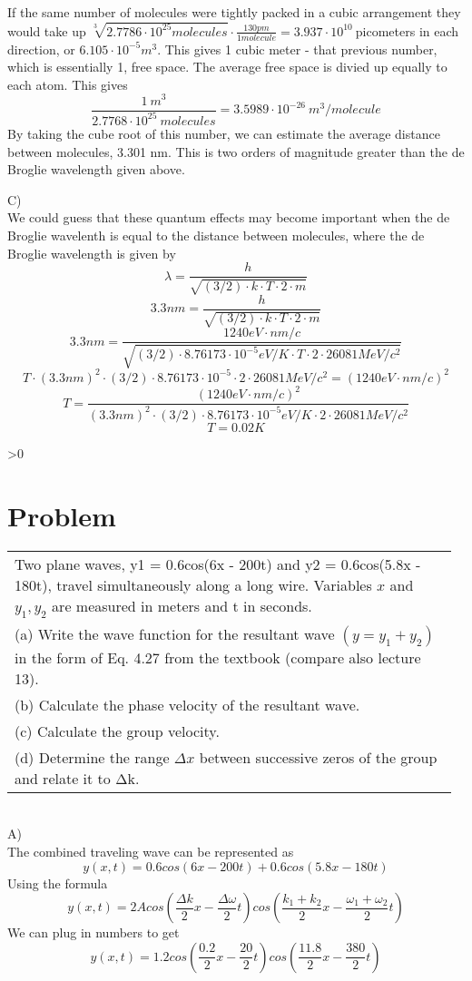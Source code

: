\documentclass{article}
\newcounter{problemnumber}\setcounter{problemnumber}{1}
\newcommand{\problem}[1][-1]{
    \setcounter{partnumber}{1}
    \ifnum#1>0
        \setcounter{problemnumber}{#1}
    \fi
    \section*{Problem \arabic{problemnumber}}
    \stepcounter{problemnumber}
}
\newcounter{partnumber}\setcounter{partnumber}{1}
\newenvironment{question}{
    \color{gray}\itshape
    \vspace{5pt}
    \begin{tabular}{|p{0.97\linewidth}}
}{
    \end{tabular}\\[5pt]
}
\begin{document}
If the same number of molecules were tightly packed in a cubic arrangement they would take up $\sqrt[3]{2.7786 \cdot 10^{25} molecules} \cdot \frac{130 pm}{1 molecule} = 3.937 \cdot 10^{10} \ $picometers in each direction, or $ 6.105 \cdot 10^{-5} m^3$. This gives 1 cubic meter - that previous number, which is essentially 1, free space. The average free space is divied up equally to each atom.
This gives 
$$ \frac{1\ m^3}{2.7768 \cdot 10^{25}\ molecules} = 3.5989 \cdot 10^{-26}\ m^3/molecule $$
By taking the cube root of this number, we can estimate the average distance between molecules, 3.301 nm. This is two orders of magnitude greater than the de Broglie wavelength given above.

C)\\
We could guess that these quantum effects may become important when the de Broglie wavelenth is equal to the distance between molecules, where the de Broglie wavelength is given by
$$ \lambda = \frac{h}{\sqrt{(3/2)\cdot k \cdot T \cdot 2 \cdot m}} $$
$$ 3.3 nm = \frac{h}{\sqrt{(3/2)\cdot k \cdot T \cdot 2 \cdot m}} $$
$$ 3.3 nm = \frac{1240 eV\cdot nm/c}{\sqrt{(3/2)\cdot 8.76173 \cdot 10^{-5} eV/K \cdot T \cdot 2 \cdot 26081 MeV/c^2}} $$
$$ T \cdot (3.3 nm)^2 \cdot (3/2)\cdot 8.76173 \cdot 10^{-5} \cdot 2 \cdot 26081 MeV/c^2 = (1240 eV\cdot nm/c)^2 $$
$$ T = \frac{(1240 eV\cdot nm/c)^2}{(3.3 nm)^2 \cdot (3/2)\cdot 8.76173 \cdot 10^{-5} eV/K \cdot 2 \cdot 26081 MeV/c^2} $$
$$ T = 0.02 K $$



\newpage
\problem
\begin{question}
Two plane waves, y1 = 0.6cos(6x - 200t) and y2 = 0.6cos(5.8x - 180t), travel
simultaneously along a long wire. Variables $x$ and $y_1,y_2$ are measured in meters and t
in seconds.\\
(a) Write the wave function for the resultant wave $(y = y_1+y_2)$ in the form of Eq. 4.27
from the textbook (compare also lecture 13).\\
(b) Calculate the phase velocity of the resultant wave.\\
(c) Calculate the group velocity.\\
(d) Determine the range $\Delta x$ between successive zeros of the group and relate it to Δk. 
\end{question}
A)\\
The combined traveling wave can be represented as 
$$ y(x, t) = 0.6 cos(6x - 200 t) + 0.6 cos(5.8x - 180 t) $$
Using the formula
$$ y(x, t) = 2A cos \left( \frac{\Delta k}{2} x - \frac{\Delta \omega}{2}t \right) cos \left( \frac{k_1+k_2}{2} x - \frac{\omega_1+\omega_2}{2}t \right) $$
We can plug in numbers to get
$$ y(x, t) = 1.2 cos \left( \frac{0.2}{2} x - \frac{20}{2}t \right) cos \left( \frac{11.8}{2} x - \frac{380}{2}t \right) $$
\end{document}
